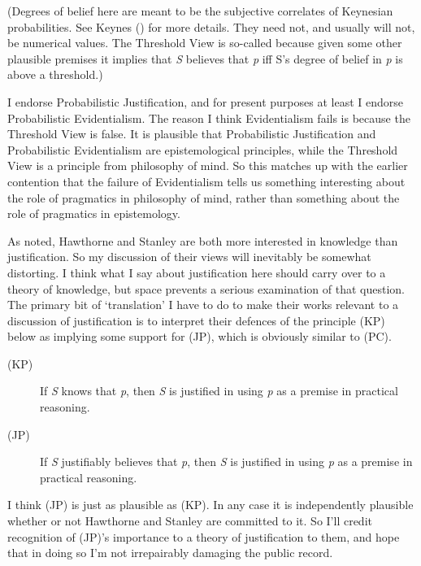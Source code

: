 \documentclass[
  11pt,
  letterpaper,
  DIV=11,
  numbers=noendperiod,
  twoside]{scrartcl}
\begin{document}
(Degrees of belief here are meant to be the subjective correlates of
Keynesian probabilities. See Keynes ()
for more details. They need not, and usually will not, be numerical
values. The Threshold View is so-called because given some other
plausible premises it implies that \emph{S} believes that \emph{p} iff
S's degree of belief in \emph{p} is above a threshold.)

I endorse Probabilistic Justification, and for present purposes at least
I endorse Probabilistic Evidentialism. The reason I think Evidentialism
fails is because the Threshold View is false. It is plausible that
Probabilistic Justification and Probabilistic Evidentialism are
epistemological principles, while the Threshold View is a principle from
philosophy of mind. So this matches up with the earlier contention that
the failure of Evidentialism tells us something interesting about the
role of pragmatics in philosophy of mind, rather than something about
the role of pragmatics in epistemology.

As noted, Hawthorne and Stanley are both more interested in knowledge
than justification. So my discussion of their views will inevitably be
somewhat distorting. I think what I say about justification here should
carry over to a theory of knowledge, but space prevents a serious
examination of that question. The primary bit of `translation' I have to
do to make their works relevant to a discussion of justification is to
interpret their defences of the principle (KP) below as implying some
support for (JP), which is obviously similar to (PC).

\begin{description}
\item[(KP)]
If \emph{S} knows that \emph{p}, then \emph{S} is justified in using
\emph{p} as a premise in practical reasoning.
\item[(JP)]
If \emph{S} justifiably believes that \emph{p}, then \emph{S} is
justified in using \emph{p} as a premise in practical reasoning.
\end{description}

I think (JP) is just as plausible as (KP). In any case it is
independently plausible whether or not Hawthorne and Stanley are
committed to it. So I'll credit recognition of (JP)'s importance to a
theory of justification to them, and hope that in doing so I'm not
irrepairably damaging the public record.
\end{document}
